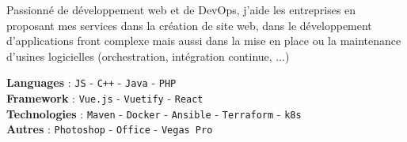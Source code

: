 \documentclass[9pt]{developercv} %
\begin{document}
\vspace{0.5cm}




\begin{minipage}[t]{0.4\textwidth} %
	\vspace{-\baselineskip} %
	
	 Passionné de développement web et de DevOps, j'aide les entreprises en proposant mes services dans la création de site web, dans le développement d'applications front complexe mais aussi dans la mise en place ou la maintenance d'usines logicielles (orchestration, intégration continue, ...)
\end{minipage}
\hfill %
\begin{minipage}[t]{0.5\textwidth} %
	\vspace{-\baselineskip} %
	
	\textbf{Languages}  : \texttt{JS} - \texttt{C++} - \texttt{Java} - \texttt{PHP}\\

	\textbf{Framework} :  \texttt{Vue.js} - \texttt{Vuetify} - \texttt{React}\\
	
	\textbf{Technologies} :  \texttt{Maven} - \texttt{Docker} - \texttt{Ansible} - \texttt{Terraform} - \texttt{k8s}\\
	
	\textbf{Autres} :  \texttt{Photoshop} - \texttt{Office} - \texttt{Vegas Pro}

\end{minipage}



\end{document}
